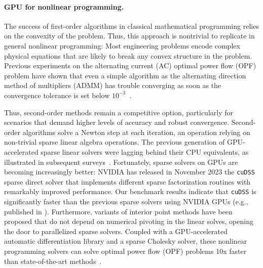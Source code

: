 \paragraph{GPU for nonlinear programming.}
The success of first-order algorithms in classical mathematical programming
relies on the convexity of the problem. Thus, this approach is nontrivial to replicate
in general nonlinear programming: Most engineering problems encode complex
physical equations that are likely to break any convex structure in the problem.
Previous experiments on the alternating current (AC) optimal power flow (OPF) problem have shown that even a simple
algorithm as the alternating direction method of multipliers (ADMM) has trouble converging as soon as the convergence
tolerance is set below $10^{-3}$~\cite{kimLeveragingGPUBatching2021}.

Thus, second-order methods remain a competitive option, particularly
for scenarios that demand higher levels of accuracy and robust convergence.
Second-order algorithms solve a Newton step at each
iteration, an operation relying on non-trivial sparse linear algebra operations.
The previous generation of GPU-accelerated sparse linear
solvers were lagging behind their CPU equivalents, as illustrated in
subsequent surveys~\cite{swirydowicz2021linear,tasseff2019exploring}.
Fortunately, sparse solvers on GPUs are becoming increasingly better: NVIDIA has released in November 2023
the {\tt cuDSS} sparse direct solver that implements different sparse factorization routines with remarkably improved performance.
Our benchmark results indicate that {\tt cuDSS} is significantly faster than the previous sparse solvers using NVIDIA GPUs (e.g., published in \cite{shin2023accelerating}).
Furthermore, variants of interior point methods have been proposed
that do not depend on numerical pivoting in the linear solves,
opening the door to parallelized sparse solvers.
Coupled with a GPU-accelerated automatic differentiation library and a
sparse Cholesky solver, these nonlinear programming solvers can solve
optimal power flow (OPF) problems 10x faster than state-of-the-art
methods~\cite{shin2023accelerating}.

